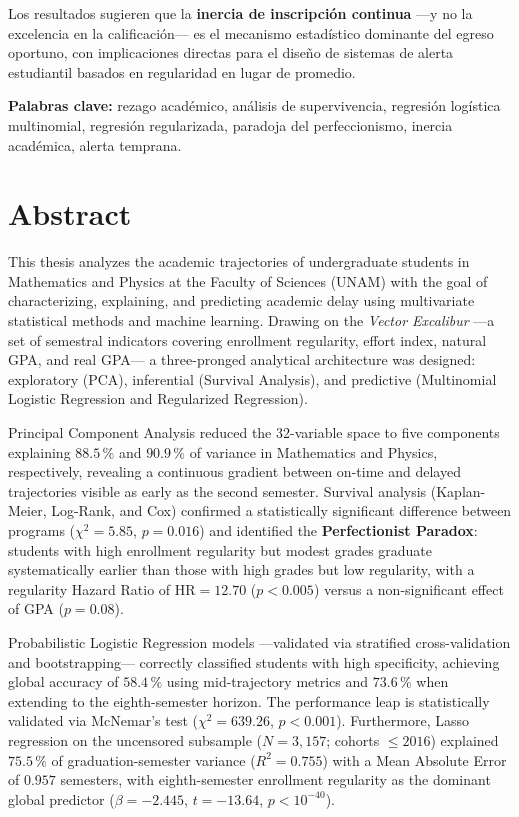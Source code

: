 Los resultados sugieren que la \textbf{inercia de inscripción continua} —y no la excelencia
en la calificación— es el mecanismo estadístico dominante del egreso oportuno, con implicaciones
directas para el diseño de sistemas de alerta estudiantil basados en regularidad en lugar de
promedio.

\bigskip
\noindent\textbf{Palabras clave:} rezago académico, análisis de supervivencia, regresión logística multinomial,
regresión regularizada, paradoja del perfeccionismo, inercia académica, alerta temprana.

\chapter*{Abstract}

This thesis analyzes the academic trajectories of undergraduate students in Mathematics and
Physics at the Faculty of Sciences (UNAM) with the goal of characterizing, explaining, and
predicting academic delay using multivariate statistical methods and machine learning. Drawing
on the \emph{Vector Excalibur} —a set of semestral indicators covering enrollment regularity,
effort index, natural GPA, and real GPA— a three-pronged analytical architecture was designed:
exploratory (PCA), inferential (Survival Analysis), and predictive (Multinomial Logistic Regression and
Regularized Regression).

Principal Component Analysis reduced the 32-variable space to five components explaining
$88.5\,\%$ and $90.9\,\%$ of variance in Mathematics and Physics, respectively, revealing
a continuous gradient between on-time and delayed trajectories visible as early as the second
semester. Survival analysis (Kaplan-Meier, Log-Rank, and Cox) confirmed a statistically
significant difference between programs ($\chi^2 = 5.85$, $p = 0.016$) and identified the
\textbf{Perfectionist Paradox}: students with high enrollment regularity but modest grades
graduate systematically earlier than those with high grades but low regularity, with a
regularity Hazard Ratio of $\text{HR} = 12.70$ ($p < 0.005$) versus a non-significant
effect of GPA ($p = 0.08$).

Probabilistic Logistic Regression models —validated via stratified cross-validation and bootstrapping—
correctly classified students with high specificity, achieving global accuracy of $58.4\,\%$ 
using mid-trajectory metrics and $73.6\,\%$ when extending to the eighth-semester horizon. 
The performance leap is statistically validated via McNemar's test ($\chi^2 = 639.26$, $p < 0.001$). 
Furthermore, Lasso regression on the uncensored subsample ($N = 3{,}157$; cohorts $\leq 2016$) 
explained $75.5\,\%$ of graduation-semester variance ($R^2 = 0.755$) with a Mean Absolute Error of $0.957$ semesters, 
with eighth-semester enrollment regularity as the dominant global predictor ($\beta = -2.445$, $t = -13.64$, $p < 10^{-40}$).

